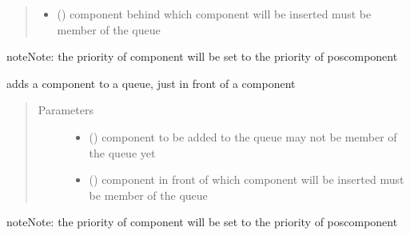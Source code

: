 \documentclass[letterpaper,10pt,english]{sphinxmanual}
\begin{document}
\begin{fulllineitems}
\begin{fulllineitems}
\begin{quote}
\begin{description}
\begin{itemize}
\item {} 
 ({\hyperref[\detokenize{Reference:salabim.Component}]{}}) \textendash{} component behind which component will be inserted 
must be member of the queue

\end{itemize}

\end{description}\end{quote}

\begin{sphinxadmonition}{note}{Note:}
the priority of component will be set to the priority of poscomponent
\end{sphinxadmonition}

\end{fulllineitems}


\begin{fulllineitems}
\label{\detokenize{Reference:salabim.Queue.add_in_front_of}}
adds a component to a queue, just in front of a component
\begin{quote}\begin{description}
\item[{Parameters}] \leavevmode\begin{itemize}
\item {} 
 ({\hyperref[\detokenize{Reference:salabim.Component}]{}}) \textendash{} component to be added to the queue 
may not be member of the queue yet

\item {} 
 ({\hyperref[\detokenize{Reference:salabim.Component}]{}}) \textendash{} component in front of which component will be inserted 
must be member of the queue

\end{itemize}

\end{description}\end{quote}

\begin{sphinxadmonition}{note}{Note:}
the priority of component will be set to the priority of poscomponent
\end{sphinxadmonition}


\end{fulllineitems}
\end{fulllineitems}
\end{document}
